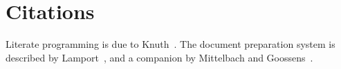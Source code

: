 \documentclass{article}
\begin{document}
\section{Citations}
Literate programming is due to Knuth~\cite{knuth84}. The document
preparation system is described by Lamport~\cite{lamport94}, and a
companion by Mittelbach and Goossens~\cite{mittelbach04}.
\printbibliography
\end{document}
